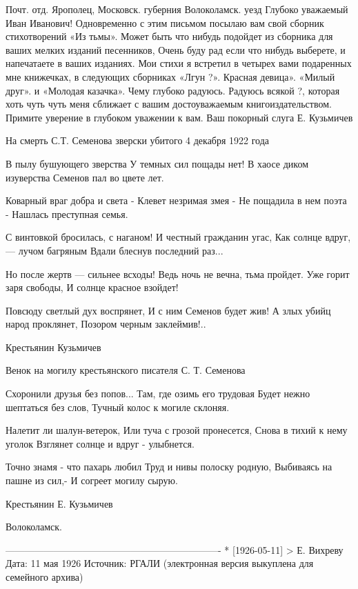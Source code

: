 Почт. отд. Ярополец, Московск. губерния Волоколамск. уезд
Глубоко уважаемый Иван Иванович!
Одновременно с этим письмом посылаю вам свой сборник стихотворений «Из тьмы». Может быть что нибудь подойдет из сборника для ваших мелких изданий песенников, Очень буду рад если что нибудь выберете, и напечатаете в ваших изданиях.
Мои стихи я встретил в четырех вами подаренных мне книжечках, в следующих сборниках «Лгун ?». Красная девица». «Милый друг». и «Молодая казачка». Чему глубоко радуюсь.  Радуюсь всякой  ?, которая хоть чуть чуть меня сближает с вашим достоуважаемым книгоиздательством.
Примите уверение в глубоком уважении к вам.
Ваш покорный слуга Е. Кузьмичев



На смерть С.Т. Семенова
зверски убитого 4 декабря 1922 года

В пылу бушующего зверства
  У темных сил пощады нет!
В хаосе диком изуверства
  Семенов пал во цвете лет.

Коварный враг добра и света -
  Клевет незримая змея -
Не пощадила в нем поэта -
  Нашлась преступная семья.

С винтовкой бросилась, с наганом!
  И честный гражданин угас,
Как солнце вдруг, — лучом багряным
  Вдали блеснув последний раз...

Но после жертв — сильнее всходы!
  Ведь ночь не вечна, тьма пройдет.
Уже горит заря свободы,
  И солнце красное взойдет!

Повсюду светлый дух воспрянет,
  И с ним Семенов будет жив!
А злых убийц народ проклянет,
  Позором черным заклеймив!..

Крестьянин Кузьмичев





Венок на могилу
крестьянского писателя
С. Т. Семенова     

Схоронили друзья без попов...
  Там, где озимь его трудовая
Будет нежно шептаться без слов,
  Тучный колос к могиле склоняя.

Налетит ли шалун-ветерок,
  Или туча с грозой пронесется,
Снова в тихий к нему уголок
  Взглянет солнце и вдруг - улыбнется.

Точно знамя - что пахарь любил
  Труд и нивы полоску родную,
Выбиваясь на пашне из сил,-
  И согреет могилу сырую.                 

  Крестьянин Е. Кузьмичев
  
  Волоколамск.

-------------------------------------------------------------------
* [1926-05-11] > Е. Вихреву 
Дата: 11 мая 1926
Источник: РГАЛИ
(электронная версия выкуплена для семейного архива)

